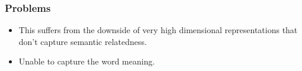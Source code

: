 \begin{frame}[fragile]\frametitle{Problems}
\begin{itemize}
\item This suffers from the downside of very high dimensional representations that don’t capture semantic relatedness.
\item Unable to capture the word meaning.
\end{itemize}
\end{frame}









